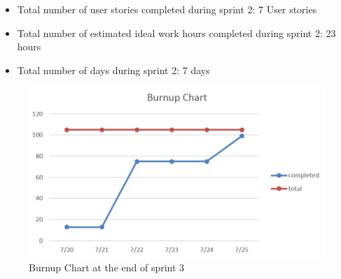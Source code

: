 \documentclass[10pt]{article}
\begin{document}
	\begin{itemize}
            \item Total number of user stories completed during sprint 2: 7 User stories
    \end{itemize}

    \begin{itemize}
            \item Total number of estimated ideal work hours completed during sprint 2: 23 hours
    \end{itemize}

    \begin{itemize}
            \item Total number of days during sprint 2: 7 days
    \end{itemize}


    \begin{figure}[!ht]
  	
  	\centering
    		\includegraphics[width=1\textwidth]{Burnupchart3}
    \caption{Burnup Chart at the end of sprint 3}
    \end{figure}

\vspace{5cm}
\end{document}
